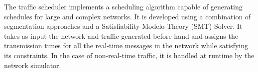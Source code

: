 \documentclass[conference]{IEEEtran}
\begin{document}

The traffic scheduler implements a scheduling algorithm capable of generating schedules for large and complex networks. It is developed using a combination of segmentation approaches and a Satisfiability Modelo Theory (SMT) Solver. It takes as input the network and traffic generated before-hand and assigns the transmission times for all the real-time messages in the network while satisfying its constraints. In the case of non-real-time traffic, it is handled at runtime by the network simulator.
\end{document}

